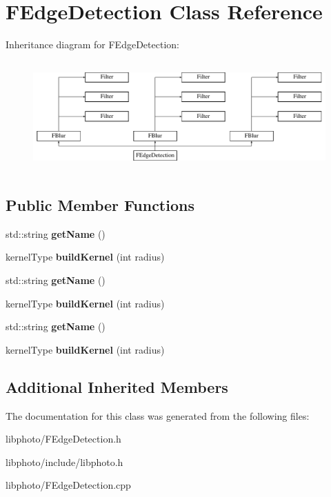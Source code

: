 \hypertarget{classFEdgeDetection}{\section{F\-Edge\-Detection Class Reference}
\label{classFEdgeDetection}
}
Inheritance diagram for F\-Edge\-Detection\-:\begin{figure}[H]
\begin{center}
\leavevmode
\includegraphics[height=4.242424cm]{classFEdgeDetection}
\end{center}
\end{figure}
\subsection*{Public Member Functions}
\begin{DoxyCompactItemize}
\item 
\hypertarget{classFEdgeDetection_acdf7ec56e2f1f5010b84ebcd66a958f3}{std\-::string {\bfseries get\-Name} ()}\label{classFEdgeDetection_acdf7ec56e2f1f5010b84ebcd66a958f3}

\item 
\hypertarget{classFEdgeDetection_a58c541bf60eb4e21bdb656bdad5f8c65}{kernel\-Type {\bfseries build\-Kernel} (int radius)}\label{classFEdgeDetection_a58c541bf60eb4e21bdb656bdad5f8c65}

\item 
\hypertarget{classFEdgeDetection_acdf7ec56e2f1f5010b84ebcd66a958f3}{std\-::string {\bfseries get\-Name} ()}\label{classFEdgeDetection_acdf7ec56e2f1f5010b84ebcd66a958f3}

\item 
\hypertarget{classFEdgeDetection_a58c541bf60eb4e21bdb656bdad5f8c65}{kernel\-Type {\bfseries build\-Kernel} (int radius)}\label{classFEdgeDetection_a58c541bf60eb4e21bdb656bdad5f8c65}

\item 
\hypertarget{classFEdgeDetection_acdf7ec56e2f1f5010b84ebcd66a958f3}{std\-::string {\bfseries get\-Name} ()}\label{classFEdgeDetection_acdf7ec56e2f1f5010b84ebcd66a958f3}

\item 
\hypertarget{classFEdgeDetection_a58c541bf60eb4e21bdb656bdad5f8c65}{kernel\-Type {\bfseries build\-Kernel} (int radius)}\label{classFEdgeDetection_a58c541bf60eb4e21bdb656bdad5f8c65}

\end{DoxyCompactItemize}
\subsection*{Additional Inherited Members}


The documentation for this class was generated from the following files\-:\begin{DoxyCompactItemize}
\item 
libphoto/F\-Edge\-Detection.\-h\item 
libphoto/include/libphoto.\-h\item 
libphoto/F\-Edge\-Detection.\-cpp\end{DoxyCompactItemize}
